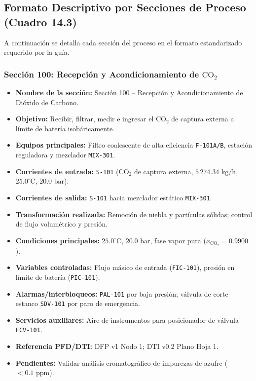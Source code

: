 \documentclass[10pt,letterpaper]{article}
\begin{document}
\subsection{Formato Descriptivo por Secciones de Proceso (Cuadro 14.3)}
A continuación se detalla cada sección del proceso en el formato estandarizado requerido por la guía.

\subsubsection{Sección 100: Recepción y Acondicionamiento de \texorpdfstring{$\text{CO}_2$}{CO2}}
\begin{itemize}
    \item \textbf{Nombre de la sección:} Sección 100 -- Recepción y Acondicionamiento de Dióxido de Carbono.
    \item \textbf{Objetivo:} Recibir, filtrar, medir e ingresar el $\text{CO}_2$ de captura externa a límite de batería isobáricamente.
    \item \textbf{Equipos principales:} Filtro coalescente de alta eficiencia \texttt{F-101A/B}, estación reguladora y mezclador \texttt{MIX-301}.
    \item \textbf{Corrientes de entrada:} \texttt{S-101} ($\text{CO}_2$ de captura externa, $5\,274.34\text{ kg/h}$, $25.0^\circ\text{C}$, $20.0\text{ bar}$).
    \item \textbf{Corrientes de salida:} \texttt{S-101} hacia mezclador estático \texttt{MIX-301}.
    \item \textbf{Transformación realizada:} Remoción de niebla y partículas sólidas; control de flujo volumétrico y presión.
    \item \textbf{Condiciones principales:} $25.0^\circ\text{C}$, $20.0\text{ bar}$, fase vapor pura ($x_{\text{CO}_2} = 0.9900$).
    \item \textbf{Variables controladas:} Flujo másico de entrada (\texttt{FIC-101}), presión en límite de batería (\texttt{PIC-101}).
    \item \textbf{Alarmas/interbloqueos:} \texttt{PAL-101} por baja presión; válvula de corte estanco \texttt{SDV-101} por paro de emergencia.
    \item \textbf{Servicios auxiliares:} Aire de instrumentos para posicionador de válvula \texttt{FCV-101}.
    \item \textbf{Referencia PFD/DTI:} DFP v1 Nodo 1; DTI v0.2 Plano Hoja 1.
    \item \textbf{Pendientes:} Validar análisis cromatográfico de impurezas de azufre ($<0.1\text{ ppm}$).
\end{itemize}
\end{document}
